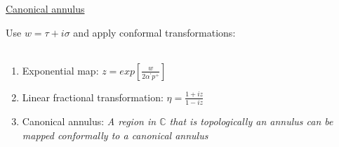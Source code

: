 \documentclass[11pt,aspectratio=169]{beamer}
\begin{document}
\begin{frame}{\underline{Canonical annulus}}

	Use $w = \tau + i \sigma$ and apply conformal transformations:
	\\~\\
	\begin{enumerate}
		\item Exponential map: $z = exp[\frac{w}{2 \alpha^{'} p^+}]$
		\item Linear fractional transformation: $\eta = \frac{1+iz}{1-iz}$
		\item Canonical annulus: \textit{A region in $\mathbb{C}$ that is topologically an annulus can be mapped conformally to a canonical annulus}

	\end{enumerate}


\end{frame}
\end{document}
